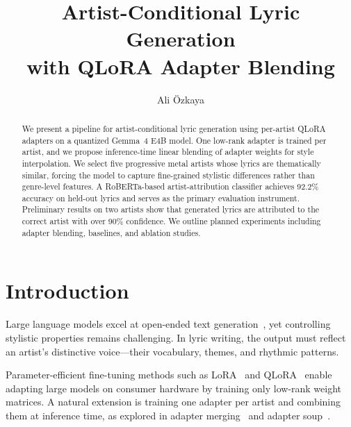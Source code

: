\documentclass[runningheads]{llncs}
\begin{document}
\title{Artist-Conditional Lyric Generation\\with QLoRA Adapter Blending}

\author{Ali \"Ozkaya}

\maketitle

\begin{abstract}
We present a pipeline for artist-conditional lyric generation using per-artist QLoRA adapters on a quantized Gemma~4 E4B model. One low-rank adapter is trained per artist, and we propose inference-time linear blending of adapter weights for style interpolation. We select five progressive metal artists whose lyrics are thematically similar, forcing the model to capture fine-grained stylistic differences rather than genre-level features. A RoBERTa-based artist-attribution classifier achieves 92.2\% accuracy on held-out lyrics and serves as the primary evaluation instrument. Preliminary results on two artists show that generated lyrics are attributed to the correct artist with over 90\% confidence. We outline planned experiments including adapter blending, baselines, and ablation studies.
\end{abstract}


\section{Introduction}
\label{sec:intro}

Large language models excel at open-ended text generation~\cite{radford2019language}, yet controlling stylistic properties remains challenging. In lyric writing, the output must reflect an artist's distinctive voice---their vocabulary, themes, and rhythmic patterns.

Parameter-efficient fine-tuning methods such as LoRA~\cite{hu2022lora} and QLoRA~\cite{dettmers2023qlora} enable adapting large models on consumer hardware by training only low-rank weight matrices. A natural extension is training one adapter per artist and combining them at inference time, as explored in adapter merging~\cite{huang2023lorahub} and adapter soup~\cite{chronopoulou2023adaptersoup}.
\end{document}
